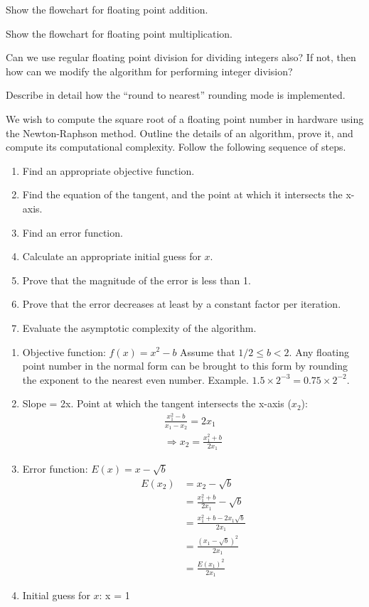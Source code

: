 \begin{ExerciseList}
\Exercise
Show the flowchart for floating point addition.

\Exercise
Show the flowchart for floating point multiplication.

\Exercise
Can we use regular floating point division for dividing integers also? If not, then how can we modify the algorithm
for performing integer division? 

\Exercise
Describe in detail how the ``round to nearest'' rounding mode is implemented.

\Exercise[difficulty=3]
We wish to compute the square root of a floating point number in hardware using the Newton-Raphson method.
Outline the details of an algorithm, prove it, and compute its computational complexity.
Follow the following sequence of steps. 

\begin{enumerate}
\item Find an appropriate objective function. 
\item Find the equation of the tangent, and the point at which it intersects the x-axis. 
\item Find an error function. 
\item Calculate an appropriate initial guess for $x$. 
\item Prove that the magnitude of the error is less than 1.
\item Prove that the error decreases at least by a constant factor per iteration. 
\item Evaluate the asymptotic complexity of the algorithm. 
\end{enumerate} 

\Answer 
\begin{enumerate}
\item Objective function: $f(x) = x^2 - b$
Assume that $1/2 \le b < 2$. Any floating point number in the normal form can be brought to this form by
rounding the exponent to the nearest even number. Example. $1.5 \times 2^{-3} = 0.75 \times 2^{-2}$. 
\item Slope = 2x. Point at which the tangent intersects the x-axis ($x_2$):
\begin{equation}
\begin{split}
\frac{x_1^2 - b}{x_1 - x_2} = 2x_1 \\
\Rightarrow x_2 = \frac{x_1^2 + b}{2x_1} 
\end{split}
\end{equation}
\item Error function:  $E(x)  = x - \sqrt{b}$
\begin{equation}
\begin{split}
E(x_2) & = x_2 - \sqrt{b} \\
       & = \frac{x_1^2 + b}{2x_1} - \sqrt{b} \\
       & = \frac{x_1^2 + b - 2x_1\sqrt{b}}{2x_1} \\
       & = \frac{(x_1 - \sqrt{b})^2}{2x_1} \\
       & = \frac{E(x_1)^2}{2x_1}
\end{split}
\end{equation}
\item Initial guess for $x$: x = 1


\end{enumerate}
\end{ExerciseList}
